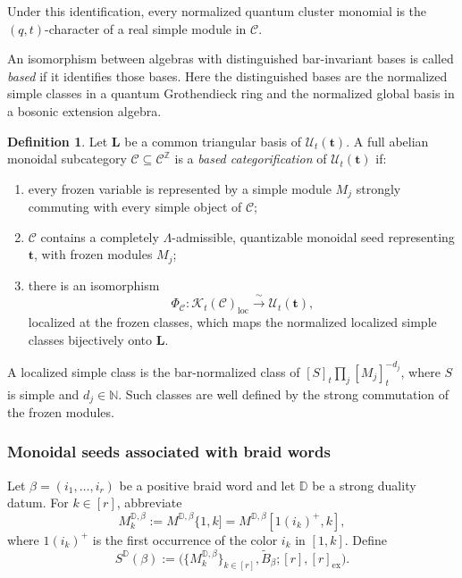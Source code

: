\documentclass[12pt, reqno]{amsart}
\theoremstyle{plain}
\theoremstyle{definition}
\newtheorem{definition}[theorem]{Definition}
\numberwithin{equation}{section}
\newcommand{\ZZ}{\mathbb{Z}}
\newcommand{\NN}{\mathbb{N}}
\newcommand{\DD}{\mathbb{D}}
\newcommand{\bt}{\mathbf{t}}
\begin{document}
Under this identification, every normalized quantum cluster monomial is the
\((q,t)\)-character of a real simple module in \(\mathscr C\).

An isomorphism between algebras with distinguished bar-invariant bases is
called \emph{based} if it identifies those bases. Here the distinguished
bases are the normalized simple classes in a quantum Grothendieck ring and
the normalized global basis in a bosonic extension algebra.


\begin{definition}\label{def:based-categorification}
Let \(\mathbf L\) be a common triangular basis of
\(\mathcal U_t(\bt)\). A full abelian monoidal subcategory
\(\mathscr C\subseteq\mathscr C^{\ZZ}\) is a
\emph{based categorification} of \(\mathcal U_t(\bt)\) if:
\begin{enumerate}
    \item every frozen variable is represented by a simple module
    \(M_j\) strongly commuting with every simple object of \(\mathscr C\);
    \item \(\mathscr C\) contains a completely \(\Lambda\)-admissible,
    quantizable monoidal seed representing \(\bt\), with frozen modules
    \(M_j\);
    \item there is an isomorphism
    \begin{equation}\label{eq:based-categorification-isomorphism}
        \Phi_{\mathscr C}\colon
        \mathcal{K}_t(\mathscr C)_{\mathrm{loc}}
        \xrightarrow{\ \sim\ }
        \mathcal U_t(\bt),
    \end{equation}
    localized at the frozen classes, which maps the normalized localized
    simple classes bijectively onto \(\mathbf L\).
\end{enumerate}

A localized simple class is the bar-normalized class of
\(
    [S]_t\prod_j[M_j]_t^{-d_j}
\), where \(S\) is simple and \(d_j\in\NN\). Such classes are
well defined by the strong commutation of the frozen modules.
\end{definition}

\subsubsection{Monoidal seeds associated with braid words}

Let \(\beta=(i_1,\ldots,i_r)\) be a positive braid word and let \(\DD\)
be a strong duality datum. For \(k\in[r]\), abbreviate
\begin{equation}\label{eq:initial-affine-determinantial-modules}
    M_k^{\DD,\beta}
    :=M^{\DD,\beta}\{1,k]
    =M^{\DD,\beta}[1(i_k)^+,k],
\end{equation}
where \(1(i_k)^+\) is the first occurrence of the color \(i_k\) in
\([1,k]\). Define
\begin{equation}\label{eq:word-monoidal-seed}
    S^{\DD}(\beta)
    :=\bigl(
        \{M_k^{\DD,\beta}\}_{k\in[r]},
        \widetilde B_\beta;
        [r],[r]_{\mathrm{ex}}
    \bigr).
\end{equation}
\end{document}

